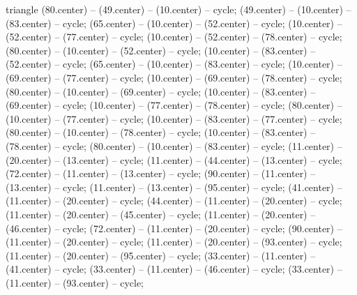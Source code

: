 \begin{pgfonlayer}{triangle}
 (80.center) -- (49.center) -- (10.center) -- cycle; 
 (49.center) -- (10.center) -- (83.center) -- cycle; 
 (65.center) -- (10.center) -- (52.center) -- cycle; 
 (10.center) -- (52.center) -- (77.center) -- cycle; 
 (10.center) -- (52.center) -- (78.center) -- cycle; 
 (80.center) -- (10.center) -- (52.center) -- cycle; 
 (10.center) -- (83.center) -- (52.center) -- cycle; 
 (65.center) -- (10.center) -- (83.center) -- cycle; 
 (10.center) -- (69.center) -- (77.center) -- cycle; 
 (10.center) -- (69.center) -- (78.center) -- cycle; 
 (80.center) -- (10.center) -- (69.center) -- cycle; 
 (10.center) -- (83.center) -- (69.center) -- cycle; 
 (10.center) -- (77.center) -- (78.center) -- cycle; 
 (80.center) -- (10.center) -- (77.center) -- cycle; 
 (10.center) -- (83.center) -- (77.center) -- cycle; 
 (80.center) -- (10.center) -- (78.center) -- cycle; 
 (10.center) -- (83.center) -- (78.center) -- cycle; 
 (80.center) -- (10.center) -- (83.center) -- cycle; 
 (11.center) -- (20.center) -- (13.center) -- cycle; 
 (11.center) -- (44.center) -- (13.center) -- cycle; 
 (72.center) -- (11.center) -- (13.center) -- cycle; 
 (90.center) -- (11.center) -- (13.center) -- cycle; 
 (11.center) -- (13.center) -- (95.center) -- cycle; 
 (41.center) -- (11.center) -- (20.center) -- cycle; 
 (44.center) -- (11.center) -- (20.center) -- cycle; 
 (11.center) -- (20.center) -- (45.center) -- cycle; 
 (11.center) -- (20.center) -- (46.center) -- cycle; 
 (72.center) -- (11.center) -- (20.center) -- cycle; 
 (90.center) -- (11.center) -- (20.center) -- cycle; 
 (11.center) -- (20.center) -- (93.center) -- cycle; 
 (11.center) -- (20.center) -- (95.center) -- cycle; 
 (33.center) -- (11.center) -- (41.center) -- cycle; 
 (33.center) -- (11.center) -- (46.center) -- cycle; 
 (33.center) -- (11.center) -- (93.center) -- cycle; 

\end{pgfonlayer}
